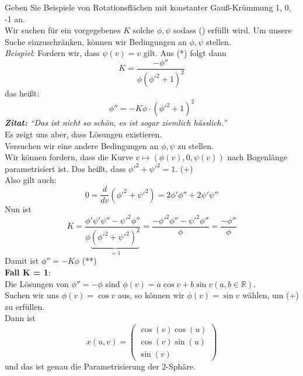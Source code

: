 \begin{problem}[2b]
  Geben Sie Beispiele von Rotationsflächen mit konstanter Gauß-Krümmung 1, 0, -1 an. \\
  Wir suchen für ein vorgegebenes \( K \) solche \( \phi, \psi \) sodass (\*) erfüllt wird. Um unsere Suche einzuschränken, können wir Bedingungen an \( \phi, \psi \) stellen. \\
  \emph{Beispiel}: Fordern wir, dass \( \psi(v) = v \) gilt. Aus (*) folgt dann 
  \begin{equation*}
    K = \frac{-\phi''}{\phi{(\phi'^2 + 1)}^2}
  \end{equation*}	
  das heißt:
  \begin{equation*}
    \phi'' = -K \phi \cdot {(\phi'^2 + 1)}^2
  \end{equation*}	
  \emph{\textbf{Zitat:}} \emph{``Das ist nicht so schön, es ist sogar ziemlich hässlich.''} \\
  Es zeigt uns aber, dass Lösungen existieren. \\
  Versuchen wir eine andere Bedingungen an \( \phi, \psi \) zu stellen. \\
  Wir können fordern, dass die Kurve \( v \mapsto (\phi(v), 0, \psi(v)) \) nach Bogenlänge parametrisiert ist. Das heißt, dass \( \phi'^2 + \psi'^2 = 1 \). (+)\\
  Also gilt auch:
  \begin{equation*}
    0 = \frac{d}{dv}(\phi'^2 + \psi'^2) = 2 \phi'\phi'' + 2 \psi' \psi''
  \end{equation*}
  Nun ist 
  \begin{equation*}
    K = \frac{\phi' \psi' \psi'' - \psi'^2 \phi''}{\phi\underbrace{{(\phi'^2 + \psi'^2)}^2}_{= 1}} = \frac{-\phi'^2 \phi'' - \psi'^2 \phi''}{\phi} = \frac{-\phi''}{\phi}
  \end{equation*}
  Damit ist \( \phi'' = -K \phi \) (**) \\
  \textbf{Fall K = 1}: \\
  Die Lösungen von \( \phi'' = - \phi \) sind \( \phi(v) = a \cos v + b \sin v (a,b \in \mathbb{R}) \). \\
  Suchen wir uns \( \phi(v) = \cos v \) aus, so können wir \( \phi(v) = \sin v \) wählen, um (+) zu erfüllen. \\
  Dann ist
  \begin{equation*}
    x(u,v) = \begin{pmatrix}
      \cos(v) \cos(u) \\
      \cos(v) \sin(u) \\
      \sin(v)	
    \end{pmatrix}
  \end{equation*}
  und das ist genau die Parametrisierung der 2-Sphäre.


\end{problem}

